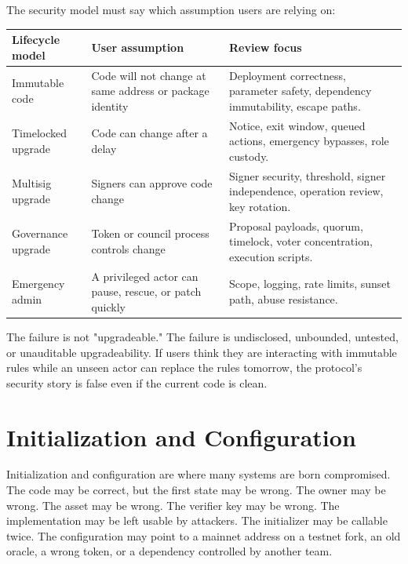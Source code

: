 The security model must say which assumption users are relying on:

\begin{table}[htbp]
\centering
\small
\renewcommand{\arraystretch}{1.15}
\begin{tabularx}{\textwidth}{@{}>{\RaggedRight\arraybackslash}p{}>{\RaggedRight\arraybackslash}p{}X@{}}
\toprule
Lifecycle model & User assumption & Review focus \\
\midrule
Immutable code & Code will not change at same address or package identity & Deployment correctness, parameter safety, dependency immutability, escape paths. \\
Timelocked upgrade & Code can change after a delay & Notice, exit window, queued actions, emergency bypasses, role custody. \\
Multisig upgrade & Signers can approve code change & Signer security, threshold, signer independence, operation review, key rotation. \\
Governance upgrade & Token or council process controls change & Proposal payloads, quorum, timelock, voter concentration, execution scripts. \\
Emergency admin & A privileged actor can pause, rescue, or patch quickly & Scope, logging, rate limits, sunset path, abuse resistance. \\
\bottomrule
\end{tabularx}
\end{table}

The failure is not "upgradeable." The failure is undisclosed, unbounded, untested, or unauditable upgradeability. If users think they are interacting with immutable rules while an unseen actor can replace the rules tomorrow, the protocol's security story is false even if the current code is clean.

\section{Initialization and Configuration}

Initialization and configuration are where many systems are born compromised. The code may be correct, but the first state may be wrong. The owner may be wrong. The asset may be wrong. The verifier key may be wrong. The implementation may be left usable by attackers. The initializer may be callable twice. The configuration may point to a mainnet address on a testnet fork, an old oracle, a wrong token, or a dependency controlled by another team.

